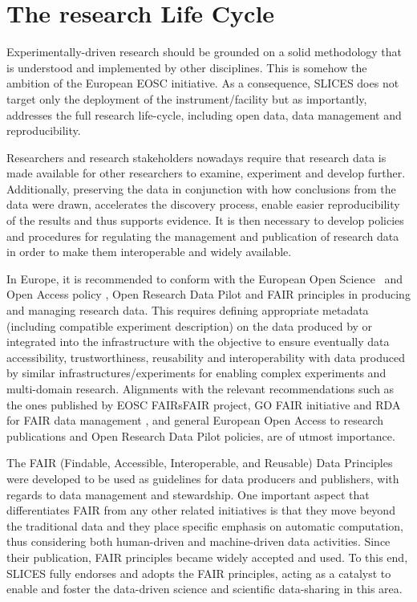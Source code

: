 
\section{The research Life Cycle}
\label{section:research}

Experimentally-driven research should be grounded on a solid methodology that is understood and implemented by other disciplines. This is somehow the ambition of the European EOSC initiative. As a consequence, SLICES does not target only the deployment of the instrument/facility but as importantly, addresses the full research life-cycle, including open data, data management and reproducibility.

Researchers and research stakeholders nowadays require that research data is made available for other researchers to examine, experiment and develop further. Additionally, preserving the data in conjunction with how conclusions from the data were drawn, accelerates the discovery process, enable easier reproducibility of the results and thus supports evidence. It is then necessary to develop policies and procedures for regulating the management and publication of research data in order to make them interoperable and widely available.

In Europe, it is recommended to conform with the European Open Science~\cite{euos} and Open Access policy \cite{euoa}, Open Research Data Pilot \cite{eu_data_pilot} and FAIR \cite{fair} principles in producing and managing research data. This requires defining appropriate metadata (including compatible experiment description) on the data produced by or integrated into the infrastructure with the objective to ensure eventually data accessibility, trustworthiness, reusability and interoperability with data produced by similar infrastructures/experiments for enabling complex experiments and multi-domain research. 
Alignments with the relevant recommendations such as the ones published by EOSC FAIRsFAIR \cite{fairsfair} project, GO FAIR initiative \cite{gofair} and RDA for FAIR data management \cite{rda2020fair}, and general European Open Access to research publications and Open Research Data Pilot policies, are of utmost importance.

The FAIR (Findable, Accessible, Interoperable, and Reusable) \cite{fair-principles} Data Principles were developed to be used as guidelines for data producers and publishers, with regards to data management and stewardship. One important aspect that differentiates FAIR from any other related initiatives is that they move beyond the traditional data and they place specific emphasis on automatic computation, thus considering both human-driven and machine-driven data activities. Since their publication, FAIR principles became widely accepted and used.
To this end, SLICES fully endorses and adopts the FAIR principles, acting as a catalyst to enable and foster the data-driven science and scientific data-sharing in this area.


